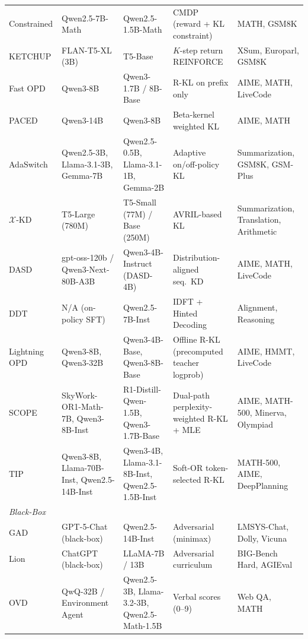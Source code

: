 \documentclass{article} %
\begin{document}
\begin{table}[t]
{\begin{tabular}{@{}lllll@{}}
        Constrained \citep{2509.22921} & Qwen2.5-7B-Math & Qwen2.5-1.5B-Math & CMDP (reward + KL constraint) & MATH, GSM8K \\
        KETCHUP \citep{2504.19024} & FLAN-T5-XL (3B) & T5-Base & $K$-step return REINFORCE & XSum, Europarl, GSM8K \\
        Fast OPD \citep{2602.15260} & Qwen3-8B & Qwen3-1.7B / 8B-Base & R-KL on prefix only & AIME, MATH, LiveCode \\
        PACED \citep{2603.11178} & Qwen3-14B & Qwen3-8B & Beta-kernel weighted KL & AIME, MATH \\
        AdaSwitch \citep{2510.07842} & Qwen2.5-3B, Llama-3.1-3B, Gemma-7B & Qwen2.5-0.5B, Llama-3.1-1B, Gemma-2B & Adaptive on/off-policy KL & Summarization, GSM8K, GSM-Plus \\
        $\mathcal{X}$-KD \citep{2602.12674} & T5-Large (780M) & T5-Small (77M) / Base (250M) & AVRIL-based KL & Summarization, Translation, Arithmetic \\
        DASD \citep{2601.09088} & gpt-oss-120b / Qwen3-Next-80B-A3B & Qwen3-4B-Instruct (DASD-4B) & Distribution-aligned seq.\ KD & AIME, MATH, LiveCode \\
        DDT \citep{2602.12222} & N/A (on-policy SFT) & Qwen2.5-7B-Inst & IDFT + Hinted Decoding & Alignment, Reasoning \\
        Lightning OPD \citep{wu2026lightning} & Qwen3-8B, Qwen3-32B & Qwen3-4B-Base, Qwen3-8B-Base & Offline R-KL (precomputed teacher logprob) & AIME, HMMT, LiveCode \\
        SCOPE \citep{zheng2026scope} & SkyWork-OR1-Math-7B, Qwen3-8B-Inst & R1-Distill-Qwen-1.5B, Qwen3-1.7B-Base & Dual-path perplexity-weighted R-KL + MLE & AIME, MATH-500, Minerva, Olympiad \\
        TIP \citep{xu2026tip} & Qwen3-8B, Llama-70B-Inst, Qwen2.5-14B-Inst & Qwen3-4B, Llama-3.1-8B-Inst, Qwen2.5-1.5B-Inst & Soft-OR token-selected R-KL & MATH-500, AIME, DeepPlanning \\
        \midrule
        \multicolumn{5}{l}{\textit{Black-Box}} \\
        \midrule
        GAD \citep{2511.10643} & GPT-5-Chat (black-box) & Qwen2.5-14B-Inst & Adversarial (minimax) & LMSYS-Chat, Dolly, Vicuna \\
        Lion \citep{2305.12870} & ChatGPT (black-box) & LLaMA-7B / 13B & Adversarial curriculum & BIG-Bench Hard, AGIEval \\
        OVD \citep{2601.21968} & QwQ-32B / Environment Agent & Qwen2.5-3B, Llama-3.2-3B, Qwen2.5-Math-1.5B & Verbal scores (0--9) & Web QA, MATH \\


\end{tabular}}
\end{table}
\end{document}
